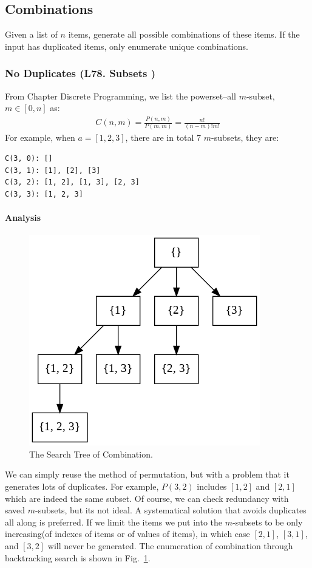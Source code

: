 \documentclass[../main.tex]{subfiles}
\begin{document}
\subsection{Combinations}
Given a list of $n$ items, generate all possible combinations of these items. If the input has duplicated items, only enumerate unique combinations. 
\subsubsection{No Duplicates (L78. Subsets
)}
From Chapter Discrete Programming, we list the powerset--all $m$-subset, $m\in[0, n]$ as:
\begin{align}
    C(n, m) = \frac{P(n, m)}{P(m, m)} = \frac{n!}{(n-m)!m!}
\end{align}
For example, when $a=[1, 2, 3]$, there are in total $7$ $m$-subsets, they are:
\begin{lstlisting}[numbers=none]
C(3, 0): []
C(3, 1): [1], [2], [3]
C(3, 2): [1, 2], [1, 3], [2, 3]
C(3, 3): [1, 2, 3]
\end{lstlisting}
\paragraph{Analysis} 
\begin{figure}[!ht]
    \centering
    \includegraphics[width= 0.5\columnwidth]{fig/combination.png}
    \caption{The Search Tree of Combination.}
    \label{fig:backtrack_combination}
\end{figure}
We can simply reuse the method of permutation, but with a problem that it generates lots of duplicates. For example, $P(3, 2)$ includes $[1, 2]$ and $[2, 1]$ which are indeed the same subset. Of course, we can check redundancy with saved $m$-subsets, but its not ideal. A systematical solution that avoids duplicates all along is preferred. If we limit the items we put into the $m$-subsets to be only increasing(of indexes of items or of values of items), in which case $[2, 1]$, $[3,1]$, and $[3,2]$ will never be generated. The enumeration of combination through backtracking search is shown in Fig.~\ref{fig:backtrack_combination}.
\end{document}
